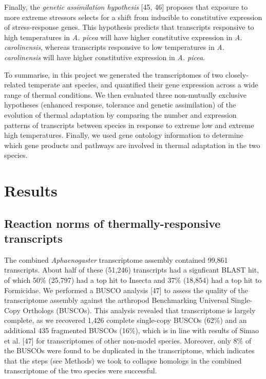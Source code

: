 \documentclass[]{article}
\begin{document}
Finally, the \emph{genetic assimilation hypothesis} {[}45, 46{]}
proposes that exposure to more extreme stressors selects for a shift
from inducible to constitutive expression of stress-response genes. This
hypothesis predicts that transcripts responsive to high temperatures in
\emph{A. picea} will have higher constitutive expression in \emph{A.
carolinensis}, whereas transcripts responsive to low temperatures in
\emph{A. carolinensis} will have higher constitutive expression in
\emph{A. picea}.

To summarise, in this project we generated the transcriptomes of two
closely-related temperate ant species, and quantified their gene
expression across a wide range of thermal conditions. We then evaluated
three non-mutually exclusive hypotheses (enhanced response, tolerance
and genetic assimilation) of the evolution of thermal adaptation by
comparing the number and expression patterns of transcripts between
species in response to extreme low and extreme high temperatures.
Finally, we used gene ontology information to determine which gene
products and pathways are involved in thermal adaptation in the two
species.

\section{Results}\label{results}

\subsection{Reaction norms of thermally-responsive
transcripts}\label{reaction-norms-of-thermally-responsive-transcripts}

The combined \emph{Aphaenogaster} transcriptome assembly contained
99,861 transcripts. About half of these (51,246) transcripts had a
signficant BLAST hit, of which 50\% (25,797) had a top hit to Insecta
and 37\% (18,854) had a top hit to Formicidae. We performed a BUSCO
analysis {[}47{]} to assess the quality of the transcriptome assembly
against the arthropod Benchmarking Universal Single-Copy Orthologs
(BUSCOs). This analysis revealed that transcriptome is largely complete,
as we recovered 1,426 complete single-copy BUSCOs (62\%) and an
additional 435 fragmented BUSCOs (16\%), which is in line with results
of Simao et al. {[}47{]} for transcriptomes of other non-model species.
Moreover, only 8\% of the BUSCOs were found to be duplicated in the
transcriptome, which indicates that the steps (see Methods) we took to
collapse homologs in the combined transcriptome of the two species were
successful.
\end{document}

